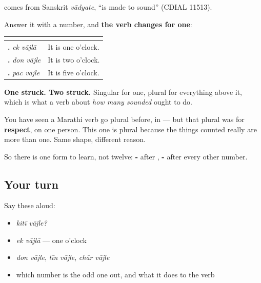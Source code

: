 \begin{cousinweb}
\textbf{} comes from Sanskrit \emph{vādyate}, \textquotedblleft{}is made to sound\textquotedblright{} (CDIAL 11513).
\end{cousinweb}

\begin{grammarlens}[title={Grammar Lens: the verb counts with you}]
Answer it with a number, and \textbf{the verb changes for one}:

\noindent
\begin{tabularx}{\linewidth}{@{}>{\raggedright\arraybackslash}X>{\raggedright\arraybackslash}X@{}}
\toprule
\textbf{} & \textbf{} \\
\midrule
\textbf{\mr{एक} \mr{वाजला}.} \emph{ek vājlā} & It is one o'clock. \\
\textbf{\mr{दोन} \mr{वाजले}.} \emph{don vājle} & It is two o'clock. \\
\textbf{\mr{पाच} \mr{वाजले}.} \emph{pāc vājle} & It is five o'clock. \\
\bottomrule
\end{tabularx}

\textbf{One struck. Two struck.} Singular for one, plural for everything above it, which is what a verb about \emph{how many sounded} ought to do.

You have seen a Marathi verb go plural before, in \textbf{  } — but that plural was for \textbf{respect}, on one person. This one is plural because the things counted really are more than one. Same shape, different reason.

So there is one form to learn, not twelve: \textbf{-} after , \textbf{-} after every other number.
\end{grammarlens}

\subsection*{Your turn}
Say these aloud:

\begin{itemize}
\raggedright
  \item \emph{kitī vājle?}
  \item \emph{ek vājlā} — one o'clock
  \item \emph{don vājle}, \emph{tīn vājle}, \emph{chār vājle}
  \item which number is the odd one out, and what it does to the verb
\end{itemize}

